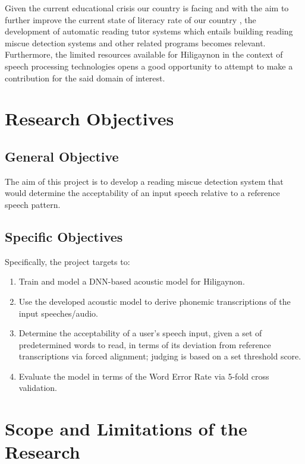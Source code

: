 Given the current educational crisis our country is facing \cite{unicef-2022} and with the aim to further improve the current state of  literacy rate of our country \cite{hernandez-2020}, the development of automatic reading tutor systems which entails building reading miscue detection systems and other related programs becomes relevant. Furthermore, the limited resources available for Hiligaynon in the context of speech processing technologies opens a good opportunity to attempt to make a contribution for the said domain of interest.

\section{Research Objectives}
\label{sec:researchobjectives}

\subsection{General Objective}
\label{sec:generalobjective}

The aim of this project is to develop a reading miscue detection system that would determine the acceptability of an input speech relative to a reference speech pattern.

\subsection{Specific Objectives}
\label{sec:specificobjectives}

Specifically, the project targets to:

\begin{enumerate}
   \item Train and model a DNN-based acoustic model for Hiligaynon.
   \item Use the developed acoustic model to derive phonemic transcriptions of the input speeches/audio.
   \item Determine the acceptability of a user's speech input, given a set of predetermined words to read, in terms of its deviation from reference transcriptions via forced alignment; judging is based on a set threshold score.
   \item Evaluate the model in terms of the Word Error Rate via 5-fold cross validation.
\end{enumerate}

\section{Scope and Limitations of the Research}
\label{sec:scopelimitations}

